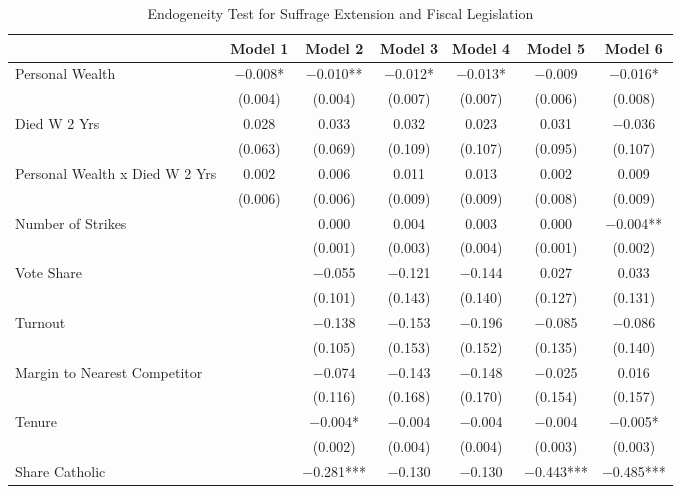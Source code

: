 \begin{table}

\caption{\label{tab:ols_endogeneity}Endogeneity Test for Suffrage Extension and Fiscal Legislation}
\centering
\begin{tabular}[t]{lcccccc}
\toprule
  & Model 1 & Model 2 & Model 3 & Model 4 & Model 5 & Model 6\\
\midrule
Personal Wealth & \num{-0.008}* & \num{-0.010}** & \num{-0.012}* & \num{-0.013}* & \num{-0.009} & \num{-0.016}*\\
 & (\num{0.004}) & (\num{0.004}) & (\num{0.007}) & (\num{0.007}) & (\num{0.006}) & (\num{0.008})\\
Died W 2 Yrs & \num{0.028} & \num{0.033} & \num{0.032} & \num{0.023} & \num{0.031} & \num{-0.036}\\
 & (\num{0.063}) & (\num{0.069}) & (\num{0.109}) & (\num{0.107}) & (\num{0.095}) & (\num{0.107})\\
Personal Wealth x Died W 2 Yrs & \num{0.002} & \num{0.006} & \num{0.011} & \num{0.013} & \num{0.002} & \num{0.009}\\
 & (\num{0.006}) & (\num{0.006}) & (\num{0.009}) & (\num{0.009}) & (\num{0.008}) & (\num{0.009})\\
Number of Strikes &  & \num{0.000} & \num{0.004} & \num{0.003} & \num{0.000} & \num{-0.004}**\\
 &  & (\num{0.001}) & (\num{0.003}) & (\num{0.004}) & (\num{0.001}) & (\num{0.002})\\
Vote Share &  & \num{-0.055} & \num{-0.121} & \num{-0.144} & \num{0.027} & \num{0.033}\\
 &  & (\num{0.101}) & (\num{0.143}) & (\num{0.140}) & (\num{0.127}) & (\num{0.131})\\
Turnout &  & \num{-0.138} & \num{-0.153} & \num{-0.196} & \num{-0.085} & \num{-0.086}\\
 &  & (\num{0.105}) & (\num{0.153}) & (\num{0.152}) & (\num{0.135}) & (\num{0.140})\\
Margin to Nearest Competitor &  & \num{-0.074} & \num{-0.143} & \num{-0.148} & \num{-0.025} & \num{0.016}\\
 &  & (\num{0.116}) & (\num{0.168}) & (\num{0.170}) & (\num{0.154}) & (\num{0.157})\\
Tenure &  & \num{-0.004}* & \num{-0.004} & \num{-0.004} & \num{-0.004} & \num{-0.005}*\\
 &  & (\num{0.002}) & (\num{0.004}) & (\num{0.004}) & (\num{0.003}) & (\num{0.003})\\
Share Catholic &  & \num{-0.281}*** & \num{-0.130} & \num{-0.130} & \num{-0.443}*** & \num{-0.485}***\\

\end{tabular}
\end{table}
